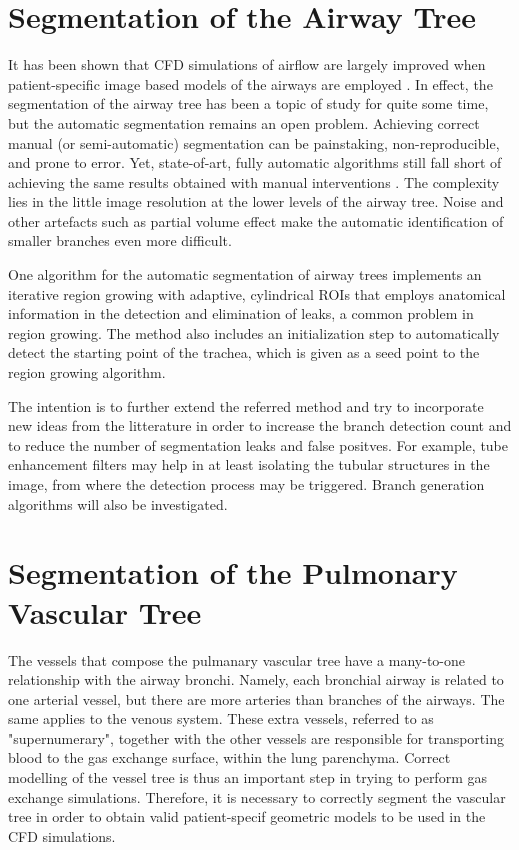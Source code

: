 \section{Segmentation of the Airway Tree}

\challenge

It has been shown that CFD simulations of airflow are largely improved when patient-specific image based models of the airways are employed \citep{Tawhai2010,Vial2005}. In effect, the segmentation of the airway tree has been a topic of study for quite some time, but the automatic segmentation remains an open problem. Achieving correct manual (or semi-automatic) segmentation can be painstaking, non-reproducible, and prone to error. Yet, state-of-art, fully automatic algorithms still fall short of achieving the same results obtained with manual interventions \citep{Lo}. The complexity lies in the little image resolution at the lower levels of the airway tree. Noise and other artefacts such as partial volume effect make the automatic identification of smaller branches even more difficult.

\approach

One algorithm for the automatic segmentation of airway trees \citep{Pinho:Airways2} implements an iterative region growing with adaptive, cylindrical ROIs that employs anatomical information in the detection and elimination of leaks, a common problem in region growing. The method also includes an initialization step to automatically detect the starting point of the trachea, which is given as a seed point to the region growing algorithm. 

The intention is to further extend the referred method and try to incorporate new ideas from the litterature \citep{Lo} in order to increase the branch detection count and to reduce the number of segmentation leaks and false positves. For example, tube enhancement filters \citep{ORLO-09} may help in at least isolating the tubular structures in the image, from where the detection process may be triggered. Branch generation algorithms \citep{Tawhai2000} will also be investigated.

\section{Segmentation of the Pulmonary Vascular Tree}

\challenge

The vessels that compose the pulmanary vascular tree have a many-to-one relationship with the airway bronchi. Namely, each bronchial airway is related to one arterial vessel, but there are more arteries than branches of the airways. The same applies to the venous system. These extra vessels, referred to as "supernumerary", together with the other vessels are responsible for transporting blood to the gas exchange surface, within the lung parenchyma. Correct modelling of the vessel tree is thus an important step in trying to perform gas exchange simulations. Therefore, it is necessary to correctly segment the vascular tree in order to obtain valid patient-specif geometric models to be used in the CFD simulations. 

